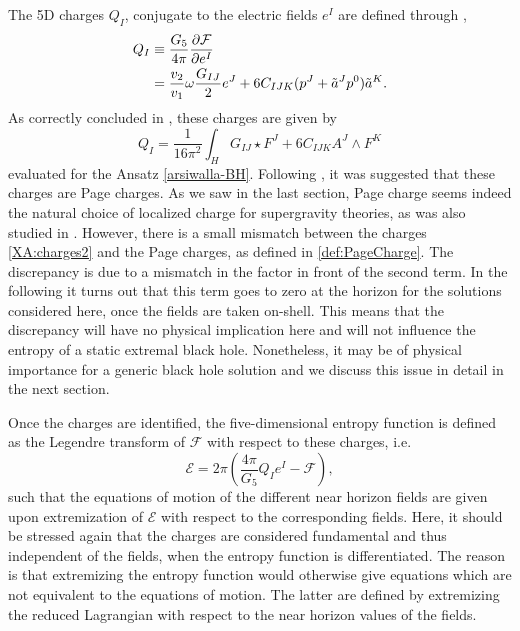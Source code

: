 \documentclass[12pt,twoside]{book}
\begin{document}
The 5D charges $Q_{I}$, conjugate to the electric fields $e^{I}$ are defined through \cite{Arsiwalla:2008gc},
\begin{align}\label{XA:charges}
Q_{I} &\equiv \frac{G_{5}}{4\pi} \frac{\partial \mathcal{F}}{\partial e^{I}} \notag\\
&= \frac{v_{2}}{v_{1}} \omega \frac{G_{IJ}}{2} e^{J} + 6C_{IJK}(p^{J} + \tilde{a}^{J}p^{0})\tilde{a}^{K}.
\end{align}
As correctly concluded in \cite{Arsiwalla:2008gc}, these charges are given by
\begin{equation}\label{XA:charges2}
Q_{I} = \frac{1}{16\pi^{2}} \int_{H} G_{IJ} \star F^{J} + 6 C_{IJK} A^{J} \wedge F^{K} 
\end{equation}
evaluated for the Ansatz \eqref{arsiwalla-BH}.
Following \cite{Arsiwalla:2008gc}, it was suggested that these charges are Page charges. As we saw in the last section, Page charge seems indeed the natural choice of localized charge for supergravity theories, as was also studied in \cite{Hanaki:2007mb}. However, there is a small mismatch between the charges \eqref{XA:charges2} and the Page charges, as defined in \eqref{def:PageCharge}. The discrepancy is due to a mismatch in the factor in front of the second term. In the following it turns out that this term goes to zero at the horizon for the solutions considered here, once the fields are taken on-shell. This means that the discrepancy will have no physical implication here and will not influence the entropy of a static extremal black hole. Nonetheless, it may be of physical importance for a generic black hole solution and we discuss this issue in detail in the next section.

Once the charges are identified, the five-dimensional entropy function is defined as the Legendre transform of $\mathcal{F}$ with respect to these charges, i.e.\
\begin{equation}\label{XA:entrFunct-def}
\mathcal{E} = 2\pi \left( \frac{4\pi}{G_{5}} Q_{I}e^{I} - \mathcal{F} \right),
\end{equation}
such that the equations of motion of the different near horizon fields are given upon extremization of $\mathcal{E}$ with respect to the corresponding fields. Here, it should be stressed again that the charges are considered fundamental and thus independent of the fields, when the entropy function is differentiated. The reason is that extremizing the entropy function would otherwise give equations which are not equivalent to the equations of motion. The latter are defined by extremizing the reduced Lagrangian with respect to the near horizon values of the fields.\newline
\end{document}

